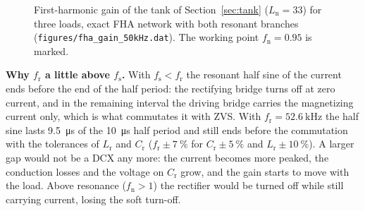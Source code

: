 \documentclass[12pt,a4paper]{scrartcl}
\newcommand{\ped}[1]{_{\mathrm{#1}}}
\newcommand{\code}[1]{\texttt{#1}}
\begin{document}
\begin{onehalfspace}
\begin{figure}[H]
	\centering
	\captionsetup{width=0.85\textwidth, font=small}
	\caption[First-harmonic gain of the CLLC tank.]{First-harmonic gain of the tank of Section~\ref{sec:tank} ($L\ped{n} = 33$) for three loads, exact FHA network with both resonant branches (\code{figures/fha\_gain\_50kHz.dat}). The working point $f\ped{n} = 0.95$ is marked.}
	\label{fig:gain}
\end{figure}

\noindent\textbf{Why $f\ped{r}$ a little above $f\ped{s}$.} With $f\ped{s} < f\ped{r}$ the resonant half sine of the current ends before the end of the half period: the rectifying bridge turns off at zero current, and in the remaining interval the driving bridge carries the magnetizing current only, which is what commutates it with ZVS. With $f\ped{r} = \SI{52.6}{\kilo\hertz}$ the half sine lasts \SI{9.5}{\micro\second} of the \SI{10}{\micro\second} half period and still ends before the commutation with the tolerances of $L\ped{r}$ and $C\ped{r}$ ($f\ped{r} \pm \SI{7}{\percent}$ for $C\ped{r} \pm \SI{5}{\percent}$ and $L\ped{r} \pm \SI{10}{\percent}$). A larger gap would not be a DCX any more: the current becomes more peaked, the conduction losses and the voltage on $C\ped{r}$ grow, and the gain starts to move with the load. Above resonance ($f\ped{n} > 1$) the rectifier would be turned off while still carrying current, losing the soft turn-off.


\end{onehalfspace}
\end{document}
